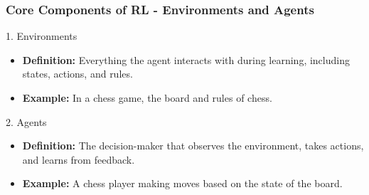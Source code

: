 \documentclass[aspectratio=169]{beamer}
\begin{document}
\begin{frame}[fragile]
    \frametitle{Core Components of RL - Environments and Agents}
    \begin{block}{1. Environments}
        \begin{itemize}
            \item \textbf{Definition:} Everything the agent interacts with during learning, including states, actions, and rules.
            \item \textbf{Example:} In a chess game, the board and rules of chess.
        \end{itemize}
    \end{block}
    
    \begin{block}{2. Agents}
        \begin{itemize}
            \item \textbf{Definition:} The decision-maker that observes the environment, takes actions, and learns from feedback.
            \item \textbf{Example:} A chess player making moves based on the state of the board.
        \end{itemize}
    \end{block}
\end{frame}
\end{document}

